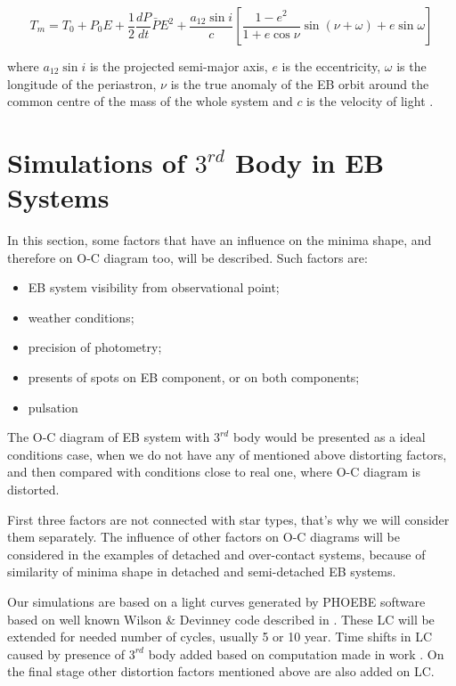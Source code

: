 \begin{equation} \label{eq:P_lin_OC_sin}
T_{m} = T_{0} + P_{0}E + \frac{1}{2} \frac{dP}{dt} \bar{P}E^{2} +
\dfrac{a_{12}\sin i}{c}   \left[  \dfrac{1-e^2}{1+e \cos\nu}   \sin(\nu + \omega)  + e \sin \omega  \right]
\end{equation} 

where $a_{12} \sin i$ is the projected semi-major axis, $e$ is the eccentricity,
$\omega$ is the longitude of the periastron, $\nu$ is the true anomaly of the EB orbit around the common centre of the mass of
the whole system and $c$ is the velocity of light \citep{irwin1952}.

\section{Simulations of $3^{rd}$ Body in EB Systems}

In this section, some factors that have an influence on the minima shape, and therefore on O-C diagram too, will be described.  
Such factors are:
\begin{itemize}[noitemsep,nolistsep]
\item EB system visibility from observational point;
\item weather conditions;
\item precision of photometry;
\item presents of spots on EB component, or on both components;
\item pulsation   
\end{itemize}

The O-C diagram of EB system with $3^{rd}$ body would be presented as a ideal conditions case, when we do not have any of mentioned above distorting factors, and then compared with conditions close to real one, where O-C diagram is distorted.

First three factors are not connected with star types, that's why we will consider them separately.
The influence of other factors on O-C diagrams will be considered in the examples of detached and over-contact systems, because of similarity of minima shape in detached and semi-detached EB systems. 

Our simulations are based on a light curves generated by PHOEBE software \citep{Prsa2005} based on well known Wilson \& Devinney code described in \cite{Wilson1971}. These LC will be extended for needed number of cycles, usually 5 or 10 year. Time shifts in LC caused by presence of $3^{rd}$ body added based on computation made in work \cite{irwin1952}. On the final stage other distortion factors mentioned above are also added on LC.   

